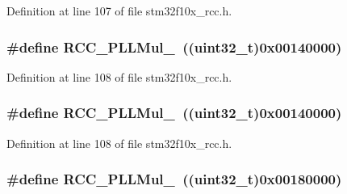 Definition at line 107 of file stm32f10x\+\_\+rcc.\+h.

\subsubsection[{\texorpdfstring{R\+C\+C\+\_\+\+P\+L\+L\+Mul\+\_\+7}{RCC_PLLMul_7}}]{\setlength{\rightskip}{0pt plus 5cm}\#define R\+C\+C\+\_\+\+P\+L\+L\+Mul\+\_~(({\bf uint32\+\_\+t})0x00140000)}\hypertarget{group___p_l_l__multiplication__factor_ga1c307e520d53fa21bc60efcb71c03e01}{}\label{group___p_l_l__multiplication__factor_ga1c307e520d53fa21bc60efcb71c03e01}


Definition at line 108 of file stm32f10x\+\_\+rcc.\+h.

\subsubsection[{\texorpdfstring{R\+C\+C\+\_\+\+P\+L\+L\+Mul\+\_\+7}{RCC_PLLMul_7}}]{\setlength{\rightskip}{0pt plus 5cm}\#define R\+C\+C\+\_\+\+P\+L\+L\+Mul\+\_~(({\bf uint32\+\_\+t})0x00140000)}\hypertarget{group___p_l_l__multiplication__factor_ga1c307e520d53fa21bc60efcb71c03e01}{}\label{group___p_l_l__multiplication__factor_ga1c307e520d53fa21bc60efcb71c03e01}


Definition at line 108 of file stm32f10x\+\_\+rcc.\+h.

\subsubsection[{\texorpdfstring{R\+C\+C\+\_\+\+P\+L\+L\+Mul\+\_\+8}{RCC_PLLMul_8}}]{\setlength{\rightskip}{0pt plus 5cm}\#define R\+C\+C\+\_\+\+P\+L\+L\+Mul\+\_~(({\bf uint32\+\_\+t})0x00180000)}\hypertarget{group___p_l_l__multiplication__factor_ga8c1f1c5fe591f062078acf603bfbfb06}{}\label{group___p_l_l__multiplication__factor_ga8c1f1c5fe591f062078acf603bfbfb06}


